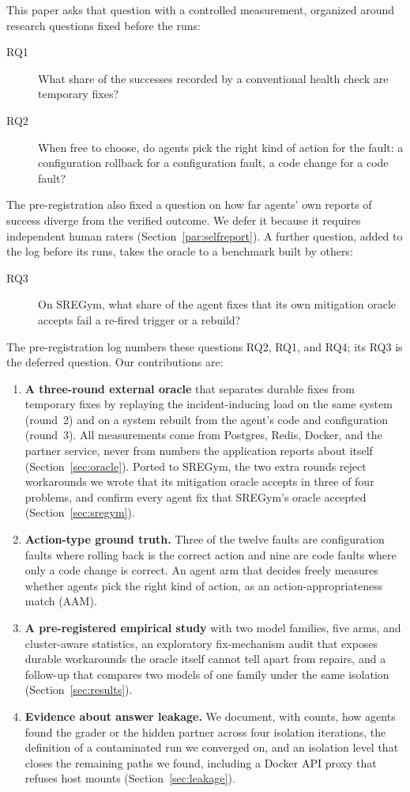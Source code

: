 This paper asks that question with a controlled measurement, organized around research questions fixed before the runs:
\begin{description}
  \item[RQ1] What share of the successes recorded by a conventional health check are temporary fixes?
  \item[RQ2] When free to choose, do agents pick the right kind of action for the fault: a configuration rollback for a
  configuration fault, a code change for a code fault?
\end{description}
The pre-registration also fixed a question on how far agents' own reports of success diverge from the verified outcome.
We defer it because it requires independent human raters (Section~\ref{par:selfreport}). A further question, added to
the log before its runs, takes the oracle to a benchmark built by others:
\begin{description}
  \item[RQ3] On SREGym, what share of the agent fixes that its own mitigation oracle accepts fail a re-fired trigger or a
  rebuild?
\end{description}
The pre-registration log numbers these questions RQ2, RQ1, and RQ4; its RQ3 is the deferred question.
Our contributions are:
\begin{enumerate}
  \item \textbf{A three-round external oracle} that separates durable fixes from temporary fixes by replaying the
  incident-inducing load on the same system (round~2) and on a system rebuilt from the agent's code and configuration
  (round~3). All measurements come from Postgres, Redis, Docker, and the partner service, never from numbers the
  application reports about itself (Section~\ref{sec:oracle}). Ported to SREGym, the two extra rounds reject
  workarounds we wrote that its mitigation oracle accepts in three of four problems, and confirm every agent fix that
  SREGym's oracle accepted (Section~\ref{sec:sregym}).
  \item \textbf{Action-type ground truth.} Three of the twelve faults are configuration faults where rolling back is the
  correct action and nine are code faults where only a code change is correct. An agent arm that decides freely measures
  whether agents pick the right kind of action, as an action-appropriateness match (AAM).
  \item \textbf{A pre-registered empirical study} with two model families, five arms, and cluster-aware statistics,
  an exploratory fix-mechanism audit that exposes durable workarounds the oracle itself cannot tell apart from repairs,
  and a follow-up that compares two models of one family under the same isolation (Section~\ref{sec:results}).
  \item \textbf{Evidence about answer leakage.} We document, with counts, how agents found the grader or the hidden
  partner across four isolation iterations, the definition of a contaminated run we converged on, and an isolation
  level that closes the remaining paths we found, including a Docker API proxy that refuses host mounts
  (Section~\ref{sec:leakage}).
\end{enumerate}

